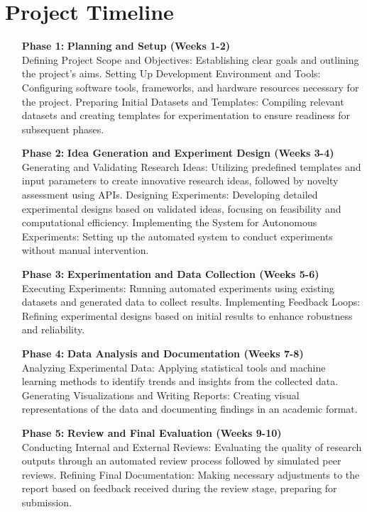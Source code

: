 \section{Project Timeline}
\begin{enumerate}[leftmargin=2cm, labelwidth=1.5cm]
    \item[\textbf{Phase 1:}] \textbf{Planning and Setup (Weeks 1-2)} \\ %
    Defining Project Scope and Objectives: Establishing clear goals and outlining the project's aims.
    Setting Up Development Environment and Tools: Configuring software tools, frameworks, and hardware resources necessary for the project.
    Preparing Initial Datasets and Templates: Compiling relevant datasets and creating templates for experimentation to ensure readiness for subsequent phases.

    \item[\textbf{Phase 2:}] \textbf{Idea Generation and Experiment Design (Weeks 3-4)} \\ %
    Generating and Validating Research Ideas: Utilizing predefined templates and input parameters to create innovative research ideas, followed by novelty assessment using APIs.
    Designing Experiments: Developing detailed experimental designs based on validated ideas, focusing on feasibility and computational efficiency.
    Implementing the System for Autonomous Experiments: Setting up the automated system to conduct experiments without manual intervention.

    \item[\textbf{Phase 3:}] \textbf{Experimentation and Data Collection (Weeks 5-6)} \\ %
    Executing Experiments: Running automated experiments using existing datasets and generated data to collect results.
    Implementing Feedback Loops: Refining experimental designs based on initial results to enhance robustness and reliability.

    \item[\textbf{Phase 4:}] \textbf{Data Analysis and Documentation (Weeks 7-8)} \\ %
    Analyzing Experimental Data: Applying statistical tools and machine learning methods to identify trends and insights from the collected data.
    Generating Visualizations and Writing Reports: Creating visual representations of the data and documenting findings in an academic format.

    \item[\textbf{Phase 5:}] \textbf{Review and Final Evaluation (Weeks 9-10)} \\ %
    Conducting Internal and External Reviews: Evaluating the quality of research outputs through an automated review process followed by simulated peer reviews.
    Refining Final Documentation: Making necessary adjustments to the report based on feedback received during the review stage, preparing for submission.
\end{enumerate}

